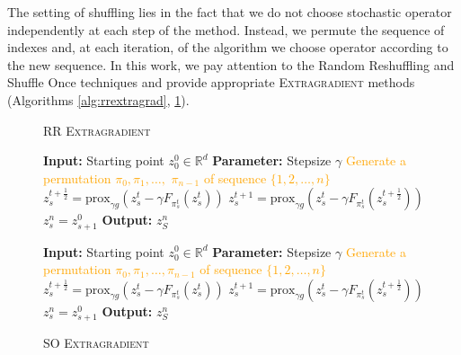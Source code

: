 \documentclass{article}
\begin{document}
The setting of shuffling lies in the fact that we do not choose stochastic operator independently at each step of the method. Instead, we permute the sequence of indexes and, at each iteration, of the algorithm we choose operator according to the new sequence. In this work, we pay attention to the Random Reshuffling and Shuffle Once techniques and provide appropriate \textsc{Extragradient} methods (Algorithms \ref{alg:rrextragrad}, \ref{alg:soextragrad}).  
\begin{figure}[htbp]
    \begin{minipage}[t]{0.5\linewidth}
        \begin{algorithm}[H]
        \footnotesize
        \caption{\textsc{RR Extragradient}}\label{alg:rrextragrad}
        \begin{algorithmic}[1]
        \State \textbf{Input:} Starting point $z^0_0\in\mathbb{R}^d$
        \State \textbf{Parameter:} Stepsize $\gamma$
            \State \textcolor{orange}{Generate a permutation $\pi_0, \pi_1, \ldots, $ $\pi_{n-1}$ of sequence $\{1, 2, \ldots, n\}$}
                \State $z^{t + \frac{1}{2}}_s = \text{prox}_{\gamma g}\left(z^t_s - \gamma F_{\pi_s^t}(z^t_s)\right)$
                \State $z^{t + 1}_s = \text{prox}_{\gamma g}\left(z^t_s - \gamma F_{\pi_s^t}(z^{t + \frac{1}{2}}_s)\right)$
            \EndFor
            \State $z_s^n = z_{s+1}^0$
        \EndFor
        \State \textbf{Output:} $z^n_S$
        \end{algorithmic}
        \end{algorithm}
    \end{minipage}
    \hfill
    \begin{minipage}[t]{0.5\linewidth}
        \begin{algorithm}[H]
        \footnotesize
        \caption{\textsc{SO Extragradient}}\label{alg:soextragrad}
        \begin{algorithmic}[1]
        \State \textbf{Input:} Starting point $z^0_0\in\mathbb{R}^d$
        \State \textbf{Parameter:} Stepsize $\gamma$
        \State \textcolor{orange}{Generate a permutation $\pi_0, \pi_1, \ldots, \pi_{n-1}$ of sequence $\{1, 2, \ldots, n\}$}
                \State $z^{t + \frac{1}{2}}_s = \text{prox}_{\gamma g}\left(z^t_s - \gamma F_{\pi_s^t}(z^t_s)\right)$
                \State $z^{t + 1}_s = \text{prox}_{\gamma g}\left(z^t_s - \gamma F_{\pi_s^t}(z^{t + \frac{1}{2}}_s)\right)$
            \EndFor
            \State $z_s^n = z_{s+1}^0$
        \EndFor
        \State \textbf{Output:} $z^n_S$
        \end{algorithmic}
        \end{algorithm}
    \end{minipage}
\end{figure}
\end{document}
